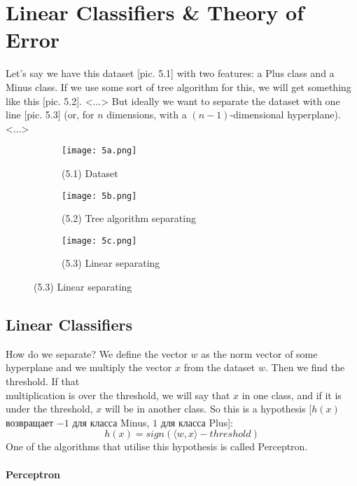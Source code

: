 \chapter{Linear Classifiers \& Theory of Error}

{\sf Let's say we have this dataset [pic. 5.1] with two features: a Plus class and a Minus class. If we use some sort of tree algorithm for this, we will get something like this [pic. 5.2]. <...> But ideally we want to separate the dataset with one line [pic. 5.3] (or, for $n$ dimensions, with a $(n-1)$-dimensional hyperplane). <...>\\
\begin{figure}[h!]
  \centering
  \begin{subfigure}[l]{0.3\linewidth}
    \texttt{[image: 5a.png]}
    \caption*{(5.1) Dataset}
  \end{subfigure}
  \begin{subfigure}[r]{0.3\linewidth}
    \texttt{[image: 5b.png]}
    \caption*{(5.2) Tree algorithm separating}
  \end{subfigure}
  \begin{subfigure}[r]{0.3\linewidth}
    \texttt{[image: 5c.png]}
    \caption*{(5.3) Linear separating}
  \end{subfigure}
\end{figure}
}

\section{Linear Classifiers}

How do we separate? We define the vector $w$ as the norm vector of some hyperplane and we multiply the vector $x$ from the dataset $w$. Then we find the threshold. If that\\ multiplication is over the threshold, we will say that $x$ in one class, and if it is under the threshold, $x$ will be in another class.
So this is a hypothesis [$h(x)$ возвращает $-1$ для класса Minus, $1$ для класса Plus]:
$$h(x)=sign\left(\langle w,x\rangle-threshold\right)$$
One of the algorithms that utilise this hypothesis is called Perceptron.

\subsubsection*{Perceptron}

